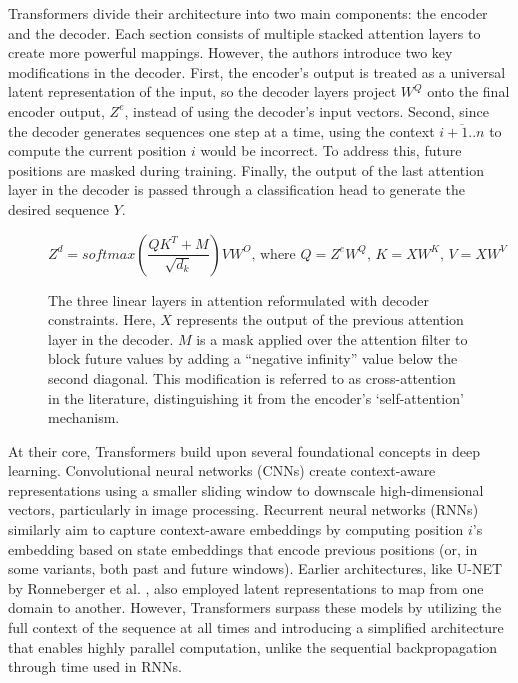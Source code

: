 \vskip 0.2in

Transformers divide their architecture into two main components: the encoder and the decoder. Each section consists of multiple stacked attention layers to create more powerful mappings. However, the authors introduce two key modifications in the decoder. First, the encoder's output is treated as a universal latent representation of the input, so the decoder layers project $W^Q$ onto the final encoder output, $Z^{e}$, instead of using the decoder's input vectors. Second, since the decoder generates sequences one step at a time, using the context $\overline{i+1..n}$ to compute the current position $i$ would be incorrect. To address this, future positions are masked during training. Finally, the output of the last attention layer in the decoder is passed through a classification head to generate the desired sequence $Y$.

\begin{figure}[h]
\[ Z^d = softmax(\frac{QK^T + M}{\sqrt{d_k}})VW^O \text{, where } Q = Z^eW^Q\text{, }K = XW^K\text{, } V = XW^V \]
\caption[Decoder Modification in Transformer Architecture]{The three linear layers in attention reformulated with decoder constraints. Here, $X$ represents the output of the previous attention layer in the decoder. $M$ is a mask applied over the attention filter to block future values by adding a “negative infinity” value below the second diagonal. This modification is referred to as cross-attention in the literature, distinguishing it from the encoder's ‘self-attention' mechanism.}
\end{figure}

At their core, Transformers build upon several foundational concepts in deep learning. Convolutional neural networks (CNNs) create context-aware representations using a smaller sliding window to downscale high-dimensional vectors, particularly in image processing. Recurrent neural networks (RNNs) similarly aim to capture context-aware embeddings by computing position $i$'s embedding based on state embeddings that encode previous positions (or, in some variants, both past and future windows). Earlier architectures, like U-NET by Ronneberger et al. \cite{ronneberger2015unetconvolutionalnetworksbiomedical}, also employed latent representations to map from one domain to another. However, Transformers surpass these models by utilizing the full context of the sequence at all times and introducing a simplified architecture that enables highly parallel computation, unlike the sequential backpropagation through time used in RNNs.

